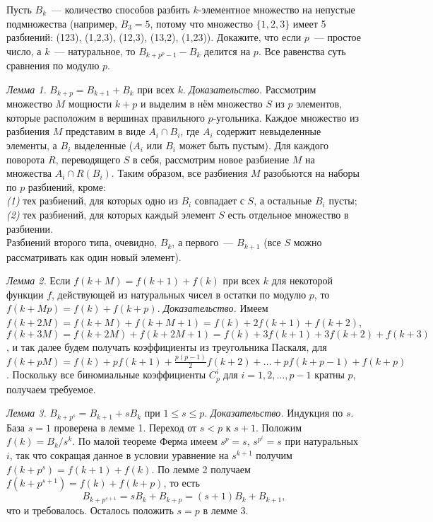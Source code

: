\problem{}
Пусть $B_k$~--- количество способов разбить $k$-элементное множество на
непустые подмножества
(например, $B_3 = 5$, потому что множество $\{1, 2, 3\}$ имеет 5 разбиений:
\textsf{(123)}, \textsf{(1,2,3)}, \textsf{(12,3)}, \textsf{(13,2)},
\textsf{(1,23)}).
Докажите, что если $p$~--- простое число, а $k$~--- натуральное, то
$B_{k + p^{p} - 1} - B_k$ делится на $p$.
\solution
Все равенства суть сравнения по модулю $p$.
\par
\emph{Лемма 1.}
$B_{k+p} = B_{k+1} + B_k$ при всех $k$. 
\emph{Доказательство.}
Рассмотрим множество $M$ мощности $k + p$ и выделим в нём множество $S$ из $p$
элементов, которые расположим в вершинах правильного $p$-угольника.
Каждое множество из разбиения $M$ представим в виде $A_i \cap B_i$, где $A_i$
содержит невыделенные элементы, а $B_i$ выделенные
($A_i$ или $B_i$ может быть пустым).
Для каждого поворота $R$, переводящего $S$ в себя, рассмотрим новое разбиение $M$ на множества $A_i \cap R(B_i)$.
Таким образом, все разбиения $M$ разобьются на наборы по $p$ разбиений, кроме:
\\\emph{(1)}
тех разбиений, для которых одно из $B_i$ совпадает с $S$, а остальные $B_i$
пусты;
\\\emph{(2)}
тех разбиений, для которых каждый элемент $S$ есть отдельное множество в
разбиении.
\\
Разбиений второго типа, очевидно, $B_k$, а первого~--- $B_{k+1}$
(все $S$ можно рассматривать как один новый элемент).
\par
\emph{Лемма 2.}
Если $f(k + M) = f(k + 1) + f(k)$ при всех $k$ для некоторой функции $f$,
действующей из натуральных чисел в остатки по модулю $p$, то
$f(k + M p) = f(k) + f(k + p)$.
\emph{Доказательство.}
Имеем
\(
    f(k + 2 M)
=
     f(k + M) + f(k + M + 1)
=
     f(k) + 2 f(k + 1) + f(k + 2)
\),
\(
    f(k + 3 M)
=
    f(k + 2 M) + f(k + 2 M + 1)
=
    f(k) + 3 f(k + 1) + 3 f(k + 2) + f(k + 3)
\),
и так далее будем получать коэффициенты из треугольника Паскаля, для
\(
    f(k + p M)
=
    f(k) + p f(k + 1) + \frac{p (p - 1)} 2 f(k + 2)
    + \ldots +
    p f(k + p - 1) + f(k + p)
\).
Поскольку все биномиальные коэффициенты $C_p^i$ для $i = 1, 2, \ldots, p - 1$
кратны $p$, получаем требуемое.
\par
\emph{Лемма 3.}
$B_{k + p^s} = B_{k + 1} + s B_{k}$ при $1 \leq s \leq p$.
\emph{Доказательство.}
Индукция по $s$.
База $s = 1$ проверена в лемме 1.
Переход от $s < p$ к $s + 1$.
Положим $f(k) = B_k / s^k$.
По малой теореме Ферма имеем $s^{p} = s$, $s^{p^i} = s$ при натуральных $i$,
так что сокращая данное в условии уравнение на $s^{k + 1}$ получим
$f(k + p^s) = f(k + 1) + f(k)$.
По лемме 2 получаем $f(k + p^{s + 1}) = f(k) + f(k + p)$, то есть
\[
    B_{k + p^{s + 1}}
=
    s B_k + B_{k + p}
=
    (s + 1) B_k + B_{k + 1},
\]
что и требовалось.
Осталось положить $s = p$ в лемме 3.
\endproblem
